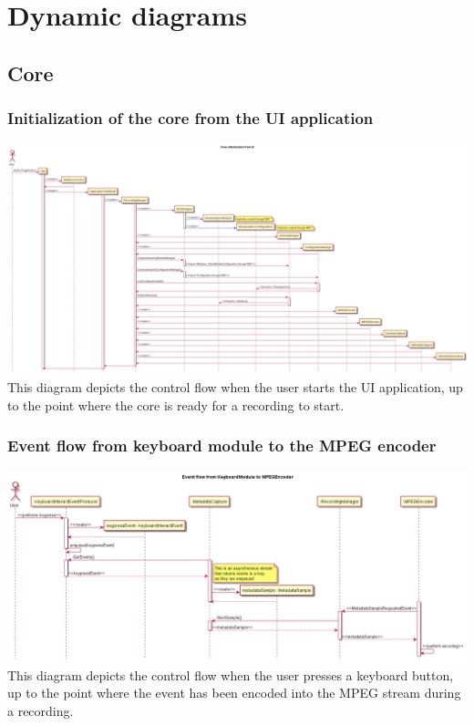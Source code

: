 \chapter{Dynamic diagrams}
\label{ch:dynamicdiagram}

\section{Core}
\subsection{Initialization of the core from the UI application}
\includegraphics[width=1.0\textwidth]{resources/DynamicDiagrams/InitCore.png}
This diagram depicts the control flow when the user starts the UI application, up to the point where the core is ready for a recording to start.

\subsection{Event flow from keyboard module to the MPEG encoder}
\includegraphics[width=1.0\textwidth]{resources/DynamicDiagrams/EventFlowKeyboardToEncoder.png}
This diagram depicts the control flow when the user presses a keyboard button, up to the point where the event has been encoded into the MPEG stream during a recording.

